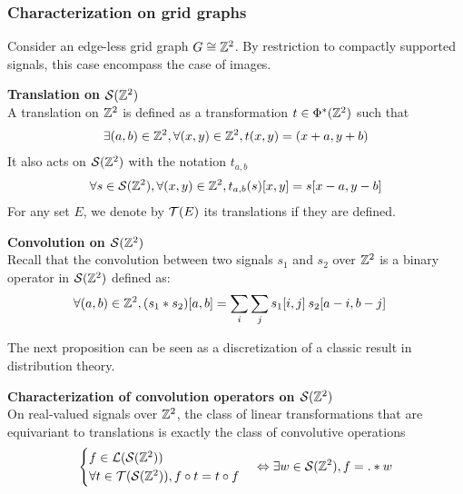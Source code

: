 \subsubsection{Characterization on grid graphs}

Consider an edge-less grid graph \ie $G \cong \bbz^2$. By restriction to compactly supported signals, this case encompass the case of images.

\begin{definition}\textbf{Translation on $\cs(\bbz^2)$}\\
A translation on $\bbz^2$ is defined as a transformation $t \in \Phi^*(\bbz^2)$ such that
\begin{gather*}
\exists (a,b) \in \bbz^2, \forall (x,y) \in \bbz^2, t(x,y) = (x+a,y+b)
\end{gather*}
It also acts on $\cs(\bbz^2)$ with the notation $t_{a,b}$ \ie
\begin{gather*}
\forall s \in \cs(\bbz^2), \forall (x,y) \in \bbz^2, t_{a,b}(s)[x,y] = s[x-a, y-b]
\end{gather*}
For any set $E$, we denote by $\ct(E)$ its translations if they are defined.
\end{definition}

\begin{definition}\textbf{Convolution on $\cs(\bbz^2)$}\\
Recall that the convolution between two signals $s_1$ and $s_2$ over $\bbz^2$ is a binary operator in $\cs(\bbz^2)$ defined as:
\begin{align*}
\forall (a,b) \in \bbz^2, (s_1 * s_2) [a,b] & = \displaystyle \sum_i \sum_j s_1[i,j] \h{2} s_2[a-i, b-j]
\end{align*}
\end{definition}

The next proposition can be seen as a discretization of a classic result in distribution theory.

\begin{proposition}\textbf{Characterization of convolution operators on $\cs(\bbz^2)$}\\
On real-valued signals over $\bbz^2$, the class of linear transformations that are equivariant to translations is exactly the class of convolutive operations \ie
\begin{gather*}
\begin{cases}
 f \in \cl(\cs(\bbz^2))\\
 \forall t \in \ct(\cs(\bbz^2)), f \circ t = t \circ f
\end{cases}
 \Leftrightarrow \exists w \in \cs(\bbz^2), f = . \ast w
\end{gather*}
\label{prop:equi}
\end{proposition}

